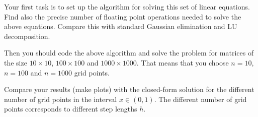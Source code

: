 \documentclass[12pt]{article}
\begin{document}
\begin{flushleft}
Your first task is to set up the algorithm for solving this set of linear equations.
Find also the precise number of floating point 
operations needed to solve the above equations. 
Compare this with standard Gaussian elimination and LU decomposition.

Then you should code the above algorithm and solve the problem for matrices of the size
$10\times 10$, $100\times 100$ and $1000\times 1000$.  That means that you choose $n=10$, $n=100$ and
$n=1000$ grid points. 

Compare your results (make plots) with the closed-form solution for the different number of grid points  in the 
interval $x\in(0,1)$.  The different number of grid points corresponds to different step lengths $h$.




\end{flushleft}
\end{document}
